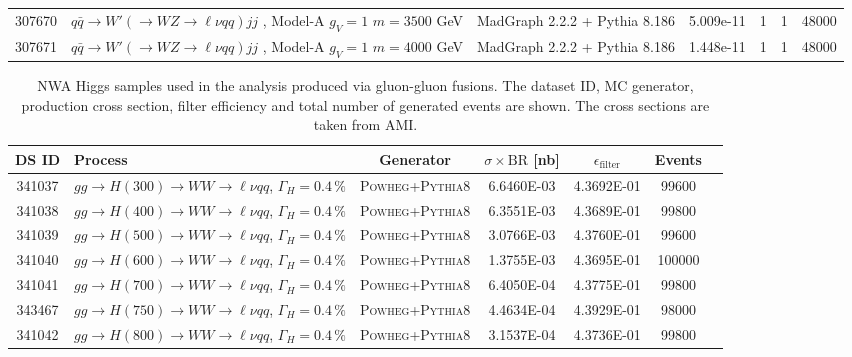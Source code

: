 \begin{landscape}
\begin{table}[!htb]
\begin{footnotesize}
\begin{center}
\begin{tabular}{|c|l|c|c|c|c|r|}
					307670 & $q\bar{q} \to W'\left(\to WZ \to \ell\nu qq\right) jj$ , Model-A $g_V=1$ $m=3500$ GeV& MadGraph 2.2.2 + Pythia 8.186 & 5.009e-11 & 1 & 1 & 48000 \\
					307671 & $q\bar{q} \to W'\left(\to WZ \to \ell\nu qq\right) jj$ , Model-A $g_V=1$ $m=4000$ GeV& MadGraph 2.2.2 + Pythia 8.186 & 1.448e-11 & 1 & 1 & 48000 \\
					\hline
				\end{tabular}
			\end{center}
		\end{footnotesize}
	\end{table}
	
	
	\begin{table}[!htb]
		\caption{NWA Higgs samples used in the analysis produced via gluon-gluon fusions. 
			The dataset ID, MC generator, production cross section, filter efficiency and total number of generated events are shown.
			The cross sections are taken from AMI.}
		\label{tabular:mc_samples_ggFH_NWA}
		\begin{footnotesize}
			\begin{center}
				\begin{tabular}{|c|l|c|c|c|c|r|}
					\hline
					DS ID & Process & Generator & $\sigma\times\text{BR}$ [nb] & $\epsilon_{\text{filter}}$ & Events \\ \hline
					341037 & $gg \to H(300) \to WW \to \ell\nu qq$, $\Gamma_H=0.4\,\%$ & \textsc{Powheg}+\textsc{Pythia8} & 6.6460E-03 & 4.3692E-01 & 99600 \\
					341038 & $gg \to H(400) \to WW \to \ell\nu qq$, $\Gamma_H=0.4\,\%$ & \textsc{Powheg}+\textsc{Pythia8} & 6.3551E-03 & 4.3689E-01 & 99800 \\
					341039 & $gg \to H(500) \to WW \to \ell\nu qq$, $\Gamma_H=0.4\,\%$ & \textsc{Powheg}+\textsc{Pythia8} & 3.0766E-03 & 4.3760E-01 & 99600 \\
					341040 & $gg \to H(600) \to WW \to \ell\nu qq$, $\Gamma_H=0.4\,\%$ & \textsc{Powheg}+\textsc{Pythia8} & 1.3755E-03 & 4.3695E-01 & 100000 \\
					341041 & $gg \to H(700) \to WW \to \ell\nu qq$, $\Gamma_H=0.4\,\%$ & \textsc{Powheg}+\textsc{Pythia8} & 6.4050E-04 & 4.3775E-01 & 99800 \\
					343467 & $gg \to H(750) \to WW \to \ell\nu qq$, $\Gamma_H=0.4\,\%$ & \textsc{Powheg}+\textsc{Pythia8} &  4.4634E-04 & 4.3929E-01 & 98000 \\
					341042 & $gg \to H(800) \to WW \to \ell\nu qq$, $\Gamma_H=0.4\,\%$ & \textsc{Powheg}+\textsc{Pythia8} & 3.1537E-04 & 4.3736E-01 & 99800 \\

\end{tabular}
\end{center}
\end{footnotesize}
\end{table}
\end{landscape}
